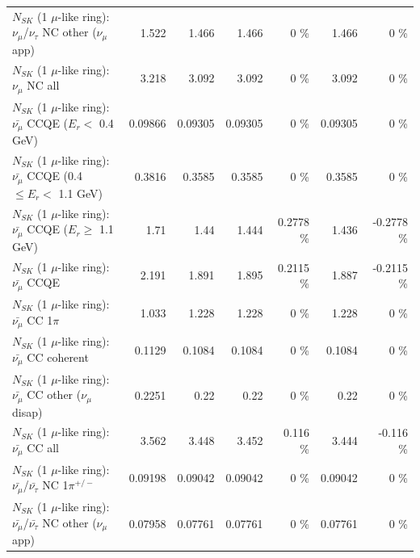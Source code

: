 \begin{table}
\begin{tabular}{| l | r | r | r  r | r  r |}
     $N_{SK}$ (1 $\mu$-like ring): $\nu_\mu$/$\nu_\tau$ NC other ($\nu_\mu$ app) &           1.522 &           1.466 &           1.466 &        0 \%  &           1.466 &        0 \%  \\ 
                                $N_{SK}$ (1 $\mu$-like ring): $\nu_{\mu}$ NC all &           3.218 &           3.092 &           3.092 &        0 \%  &           3.092 &        0 \%  \\ 
\hline
\hline
\hline
          $N_{SK}$ (1 $\mu$-like ring): $\bar{\nu_\mu}$ CCQE ($E_{r} <$ 0.4 GeV) &         0.09866 &         0.09305 &         0.09305 &        0 \%  &         0.09305 &        0 \%  \\ 
 $N_{SK}$ (1 $\mu$-like ring): $\bar{\nu_\mu}$ CCQE (0.4 $\leq E_{r} <$ 1.1 GeV) &          0.3816 &          0.3585 &          0.3585 &        0 \%  &          0.3585 &        0 \%  \\ 
       $N_{SK}$ (1 $\mu$-like ring): $\bar{\nu_\mu}$ CCQE ($E_{r} \geq$ 1.1 GeV) &            1.71 &            1.44 &           1.444 &   0.2778 \%  &           1.436 &  -0.2778 \%  \\ 
\hline
                              $N_{SK}$ (1 $\mu$-like ring): $\bar{\nu_\mu}$ CCQE &           2.191 &           1.891 &           1.895 &   0.2115 \%  &           1.887 &  -0.2115 \%  \\ 
                         $N_{SK}$ (1 $\mu$-like ring): $\bar{\nu_\mu}$ CC 1$\pi$ &           1.033 &           1.228 &           1.228 &        0 \%  &           1.228 &        0 \%  \\ 
                       $N_{SK}$ (1 $\mu$-like ring): $\bar{\nu_\mu}$ CC coherent &          0.1129 &          0.1084 &          0.1084 &        0 \%  &          0.1084 &        0 \%  \\ 
        $N_{SK}$ (1 $\mu$-like ring): $\bar{\nu_\mu}$ CC other ($\nu_\mu$ disap) &          0.2251 &            0.22 &            0.22 &        0 \%  &            0.22 &        0 \%  \\ 
                          $N_{SK}$ (1 $\mu$-like ring): $\bar{\nu_{\mu}}$ CC all &           3.562 &           3.448 &           3.452 &    0.116 \%  &           3.444 &   -0.116 \%  \\ 
\hline
  $N_{SK}$ (1 $\mu$-like ring): $\bar{\nu_\mu}$/$\bar{\nu_\tau}$ NC 1$\pi^{+/-}$ &         0.09198 &         0.09042 &         0.09042 &        0 \%  &         0.09042 &        0 \%  \\ 
$N_{SK}$ (1 $\mu$-like ring): $\bar{\nu_\mu}$/$\bar{\nu_\tau}$ NC other ($\nu_\mu$ app) &         0.07958 &         0.07761 &         0.07761 &        0 \%  &         0.07761 &        0 \%  \\ 

\end{tabular}
\end{table}
